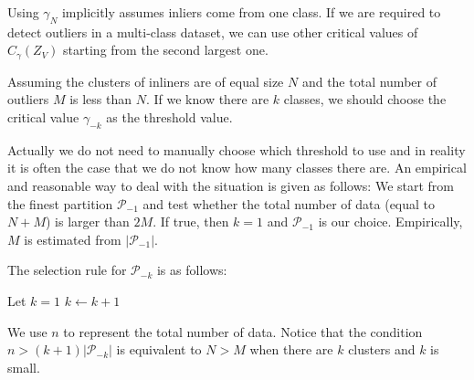 \documentclass{article}
\begin{document}
Using $\gamma_N$ implicitly assumes inliers come from one class.
If we are required to detect outliers in a multi-class dataset, we can use other critical values of $C_{\gamma}(Z_V)$ starting from the second largest one. 

Assuming the clusters of inliners are of equal size $N$ and the total number of outliers $M$ is less than $N$.
If we know there are $k$ classes, we should choose the critical value $\gamma_{-k}$ as the threshold value.

Actually we do not need to manually choose which threshold to use and in reality it is often the case that we do not know how many classes there are.
An empirical and reasonable way to deal with the situation is given as follows:
We start from the finest partition $\mathcal{P}_{-1}$ and test whether the total number of data (equal to $N+M$) is larger than $2M$. If true, then $k=1$ and $\mathcal{P}_{-1}$ is our choice.
Empirically, $M$ is estimated from $|\mathcal{P}_{-1}|$.

The selection rule for $\mathcal{P}_{-k}$ is as follows:

\begin{algorithmic}
\STATE Let $k=1$
\STATE $k\leftarrow k+1$
\ENDWHILE
\end{algorithmic}

We use $n$ to represent the total number of data. Notice that the condition $ n > (k+1) |\mathcal{P}_{-k}|$ is equivalent
to $N>M$ when there are $k$ clusters and $k$ is small.
\end{document}
